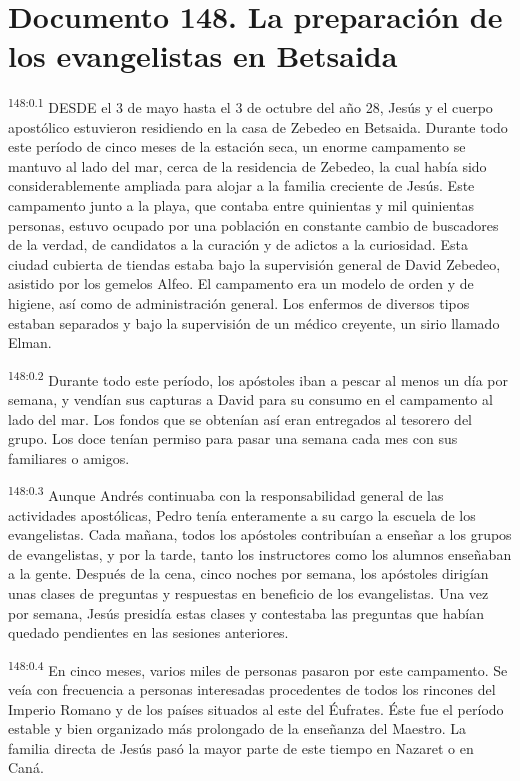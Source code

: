 \chapter{Documento 148. La preparación de los evangelistas en Betsaida}
\par
\textsuperscript{148:0.1} DESDE el 3 de mayo hasta el 3 de octubre del año 28, Jesús y el cuerpo apostólico estuvieron residiendo en la casa de Zebedeo en Betsaida. Durante todo este período de cinco meses de la estación seca, un enorme campamento se mantuvo al lado del mar, cerca de la residencia de Zebedeo, la cual había sido considerablemente ampliada para alojar a la familia creciente de Jesús. Este campamento junto a la playa, que contaba entre quinientas y mil quinientas personas, estuvo ocupado por una población en constante cambio de buscadores de la verdad, de candidatos a la curación y de adictos a la curiosidad. Esta ciudad cubierta de tiendas estaba bajo la supervisión general de David Zebedeo, asistido por los gemelos Alfeo. El campamento era un modelo de orden y de higiene, así como de administración general. Los enfermos de diversos tipos estaban separados y bajo la supervisión de un médico creyente, un sirio llamado Elman.

\par
\textsuperscript{148:0.2} Durante todo este período, los apóstoles iban a pescar al menos un día por semana, y vendían sus capturas a David para su consumo en el campamento al lado del mar. Los fondos que se obtenían así eran entregados al tesorero del grupo. Los doce tenían permiso para pasar una semana cada mes con sus familiares o amigos.

\par
\textsuperscript{148:0.3} Aunque Andrés continuaba con la responsabilidad general de las actividades apostólicas, Pedro tenía enteramente a su cargo la escuela de los evangelistas. Cada mañana, todos los apóstoles contribuían a enseñar a los grupos de evangelistas, y por la tarde, tanto los instructores como los alumnos enseñaban a la gente. Después de la cena, cinco noches por semana, los apóstoles dirigían unas clases de preguntas y respuestas en beneficio de los evangelistas. Una vez por semana, Jesús presidía estas clases y contestaba las preguntas que habían quedado pendientes en las sesiones anteriores.

\par
\textsuperscript{148:0.4} En cinco meses, varios miles de personas pasaron por este campamento. Se veía con frecuencia a personas interesadas procedentes de todos los rincones del Imperio Romano y de los países situados al este del Éufrates. Éste fue el período estable y bien organizado más prolongado de la enseñanza del Maestro. La familia directa de Jesús pasó la mayor parte de este tiempo en Nazaret o en Caná.

